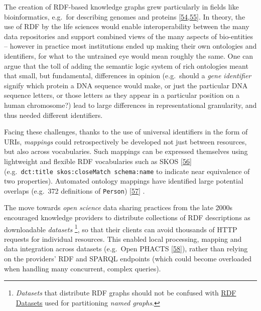 The creation of RDF-based knowledge graphs grew particularly in fields like bioinformatics, e.g.~for describing genomes and proteins {[}\protect\hyperlink{ref-bMSxa8XW}{54},\protect\hyperlink{ref-Qlrlr2TZ}{55}{]}. In theory, the use of RDF by the life sciences would enable interoperability between the many data repositories and support combined views of the many aspects of bio-entities -- however in practice most institutions ended up making their own ontologies and identifiers, for what to the untrained eye would mean roughly the same. One can argue that the toll of adding the semantic logic system of rich ontologies meant that small, but fundamental, differences in opinion (e.g.~should a \emph{gene identifier} signify which protein a DNA sequence would make, or just the particular DNA sequence letters, or those letters as they appear in a particular position on a human chromosome?) lead to large differences in representational granularity, and thus needed different identifiers.

Facing these challenges, thanks to the use of universal identifiers in the form of URIs, \emph{mappings} could retrospectively be developed not just between resources, but also across vocabularies. Such mappings can be expressed themselves using lightweight and flexible RDF vocabularies such as SKOS {[}\protect\hyperlink{ref-15gQDya5B}{56}{]} (e.g.~\texttt{dct:title\ skos:closeMatch\ schema:name} to indicate near equivalence of two properties). Automated ontology mappings have identified large potential overlaps (e.g.~372 definitions of \texttt{Person}) {[}\protect\hyperlink{ref-FDDmgO6s}{57}{]} .

The move towards \emph{open science} data sharing practices from the late 2000s encouraged knowledge providers to distribute collections of RDF descriptions as downloadable \emph{datasets} \footnote{\emph{Datasets} that distribute RDF graphs should not be confused with \href{https://www.w3.org/TR/rdf11-concepts/\#section-dataset}{RDF Datasets} used for partitioning \emph{named graphs}.}, so that their clients can avoid thousands of HTTP requests for individual resources. This enabled local processing, mapping and data integration across datasets (e.g.~Open PHACTS {[}\protect\hyperlink{ref-191ZkYZMt}{58}{]}), rather than relying on the providers' RDF and SPARQL endpoints (which could become overloaded when handling many concurrent, complex queries).

